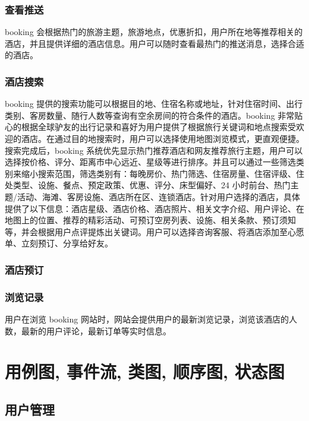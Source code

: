 \documentclass[11pt]{article}
\begin{document}
		\subsubsection{查看推送}
		booking 会根据热门的旅游主题，旅游地点，优惠折扣，用户所在地等推荐相关的酒店，并且提供详细的酒店信息。用户可以随时查看最热门的推送消息，选择合适的酒店。
		\subsubsection{酒店搜索}
		booking 提供的搜索功能可以根据目的地、住宿名称或地址，针对住宿时间、出行类别、客房数量、随行人数等查询有空余房间的符合条件的酒店。booking 非常贴心的根据全球驴友的出行记录和喜好为用户提供了根据旅行关键词和地点搜索受欢迎的酒店。在通过目的地搜索时，用户可以选择使用地图浏览模式，更直观便捷。搜索完成后，booking 系统优先显示热门推荐酒店和网友推荐旅行主题，用户可以选择按价格、评分、距离市中心远近、星级等进行排序。并且可以通过一些筛选类别来缩小搜索范围，筛选类别有：每晚房价、热门筛选、住宿房量、住宿评级、住处类型、设施、餐点、预定政策、优惠、评分、床型偏好、24 小时前台、热门主题/活动、海滩、客房设施、酒店所在区、连锁酒店。针对用户选择的酒店，具体提供了以下信息：酒店星级、酒店价格、酒店照片、相关文字介绍、用户评论、在地图上的位置、推荐的精彩活动、可预订空房列表、设施、相关条款、预订须知等，并会根据用户点评提炼出关键词。用户可以选择咨询客服、将酒店添加至心愿单、立刻预订、分享给好友。
		\subsubsection{酒店预订}
			
		
		\subsubsection{浏览记录}
		用户在浏览 booking 网站时，网站会提供用户的最新浏览记录，浏览该酒店的人数，最新的用户评论，最新订单等实时信息。
		
		




\pagebreak
{}
\section{用例图, 事件流, 类图, 顺序图, 状态图}



	\subsection{用户管理}
	
\end{document}
